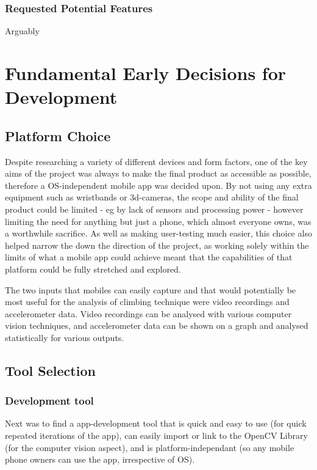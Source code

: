 \subsubsection{Requested Potential Features}
Arguably 


\section{Fundamental Early Decisions for Development}

\subsection{Platform Choice}
Despite researching a variety of different devices and form factors, one of the key aims of the project was always to make the final product as accessible as possible, therefore a OS-independent mobile app was decided upon.
By not using any extra equipment such as wristbands or 3d-cameras, the scope and ability of the final product could be limited - eg by lack of sensors and processing power - however limiting the need for anything but just a phone, which almost everyone owns, was a worthwhile sacrifice.
As well as making user-testing much easier, this choice also helped narrow the down the direction of the project, as working solely within the limits of what a mobile app could achieve meant that the capabilities of that platform could be fully stretched and explored.

The two inputs that mobiles can easily capture and that would potentially be most useful for the analysis of climbing technique were video recordings and accelerometer data.
Video recordings can be analysed with various computer vision techniques, and accelerometer data can be shown on a graph and analysed statistically for various outputs.


\subsection{Tool Selection}
\subsubsection{Development tool}
Next was to find a app-development tool that is quick and easy to use (for quick repeated iterations of the app), can easily import or link to the OpenCV Library (for the computer vision aspect), and is platform-independant (so any mobile phone owners can use the app, irrespective of OS).

